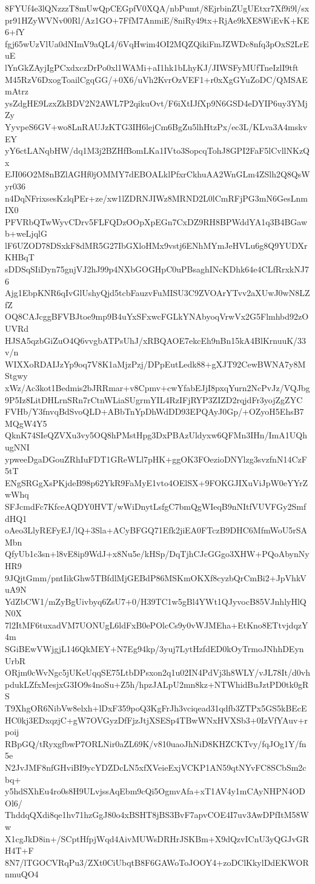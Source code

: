 8FYUf4e3lQNzzzT8mUwQpCEGpfV0XQA/nbPumt/8EjrbinZUgUEtxr7Xf9i9l/sx
pr91HZyWVNv00Rl/Az1GO+7FfM7AnmiE/8niRy49tx+RjAe9kXE8WiEvK+KE6+fY
fgj65wUzVlUa0dNImV9aQL4/6VqHwim4OI2MQZQikiFmJZWDc8nfq3pOxS2LrEuE
lYnGkZAyjIgPCxdxczDrPo0xl1WAMi+aI1hk1bLhyKJ/JIWSFyMUfTneIzlI9tft
M45RzV6DxogToailCgqGG/+0X6/uVh2KvrOzVEF1+r0xXgGYuZoDC/QMSAEmAtrz
ysZdgHE9LzxZkBDV2N2AWL7P2qikuOvt/F6iXtIJfXp9N6GSD4eDYIP6uy3YMjZy
YyvpeS6GV+wo8LnRAUJzKTG3IH6lejCm6BgZu5lhHtzPx/ec3L/KLva3A4mskvEY
yY6ctLANqbHW/dq1M3j2BZHfBomLKa1IVto3SopcqTohJ8GPI2FaF5lCvllNKzQx
EJI06O2M8nBZlAGHf0jOMMY7dEBOALklPfxrCkhuAA2WnGLm4ZSlh2Q8QsWyr036
n4DqNFrixsesKzlqPEr+ze/xw1lZDRNJIWz8MRND2L0lCmRFjPG3mN6GesLnmIX0
PFVRbQTwWyvCDrv5FLFQDzOOpXpEGn7CxDZ9RH8BPWddYA1q3B4BGawb+weLjqlG
lF6UZOD78DSxkF8dMR5G27IbGXloHMx9vstj6ENhMYmJeHVLu6g8Q9YUDXrKHBqT
sDDSqSIiDyn75gnjVJ2hJ99p4NXbGOGHpC0uPBsaghINcKDhk64e4CLfRrxkNJ76
Ajg1EbpKNR6qIvGlUshyQjd5tcbFauzvFuMISU3C9ZVOArYTvv2aXUwJ0wN8LZfZ
OQ8CAJcggBFVBJtoe9mp9B4uYxSFxwcFGLkYNAbyoqVrwVx2G5Flmhbd92zOUVRd
HJSA5qzbGiZuO4Q6vvgbATPsUhJ/xRBQAOE7ekcEh9nBn15kA4BlKrnuuK/33v/n
WIXXoRDAIJzYp9oq7V8K1aMjzPzj/DPpEutLedk88+gXJT92CewBWNA7y8MStgwy
xWz/Ac3kot1Bedmis2bJRRmar+v8Cpmv+cwYfabEJjI8pxqYurn2NcPvJz/VQJbg
9P5Iz8LitDHLrnSRn7rCtnWLiaSUgrmYIL4RzIFjRYP3ZIZD2rqjdFr3yojZgZYC
FVHb/Y3fnvqBdSvoQLD+ABbTnYpDhWdDD93EPQAyJ0Gp/+OZyoH5EhsB7MQgW4Y5
QknK74SIeQZVXu3vy5OQ8hPMstHpg3DxPBAzUldyxw6QFMn3IHn/ImA1UQhugNNI
ypweeDgaDGouZRhIuFDT1GReWLl7pHK+ggOK3FOezioDNYlzg3svzfnN14CzF5tT
ENgSRGgXsPKjdeB98p62YkR9FaMyE1vto4OElSX+9FOKGJIXuViJpW0eYYrZwWhq
SFJcmdFc7KfceAQDY0HVT/wWiDnytLsfgC7bmQgWIeqB9nNItfVUVFGy2SmfdHQ1
oAeo3LlyREFyEJ/lQ+3Sla+ACyBFGQ71Efk2jiEA0FTczB9DHC6MfmWoU5rSAMbn
QfyUb1c3sn+l8vE8ip9WdJ+x8Nu5e/kHSp/DqTjhCJcGGgo3XHW+PQoAbynNyHR9
9JQjtGmm/pntIikGhw5TBfdlMjGEBdP86MSKmOKXf8cyzbQrCmBi2+JpVhkVuA9N
YdZbCW1/mZyBgUivbyq6ZsU7+0/H39TC1w5gBl4YWt1QJyvocB85VJnhlyHlQN0X
7l2ItMF6tuxadVM7UONUgL6ldFxB0ePOlcCs9y0vWJMEha+EtKno8ETtvjdqzY4m
SGiBEwVWjgjL146QkMEY+N7Eg94kp/3yuj7LytHzfdED0kOyTrmoJNhhDEynUrbR
ORjm0cWvNgc5jUKeUqqSE75LtbDPsxon2q1u02IN4PdVj3h8WLY/vJL78It/d0vh
pdukLZfxMesjxG3IO9s4noSu+Z5h/hpzJALpU2mn8kz+NTWhidBuJztPD0tk0gRS
T9XhgOR6NibVw8elxh+lDxF359poQ3KgFrJh3vciqead31qdfb3ZTPx5GS5kBEcE
HC0kj3EDxqzjC+gW7OVGyzDfFjzJtjXSESp4TBwWNxHVXSb3+0IzVfYAuv+rpoij
RBpGQ/tRyxgfbwP7ORLNir0aZL69K/v810uaoJhNiD8KHZCKTvy/fqJOg1Y/fn5e
N2JvJMF8nfGHviBI9ycYDZDcLN5xfXVeieExjVCKP1AN59qtNYvFC8SCbSm2cbq+
y5hdSXhEu4ro0s8H9ULvjssAqEbm9cQi5OgmvAfa+xT1AV4y1mCAyNHPN4ODOl6/
ThddqQXdi8qe1hv71hzGgJ80o4xBSHT8jBS3BvF7apvCOE4I7uv3AwDPfItM58Ww
X1cgJkD8in+/SCptHfpjWqd4AivMUWsDRHrJSKBm+X9dQzvICnU3yQGJvGRH4T+F
8N7/lTGOCVRqPu3/ZXt0CiUbqtB8F6GAWoToJOOY4+zoDClKkylDdEKWORnmuQO4
